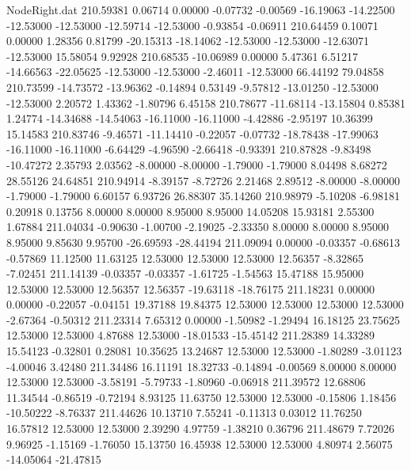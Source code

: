 \begin{filecontents}{NodeRight.dat}
 210.59381    0.06714    0.00000    -0.07732   -0.00569  -16.19063  -14.22500  -12.53000  -12.53000  -12.59714  -12.53000   -0.93854   -0.06911
 210.64459    0.10071    0.00000     1.28356    0.81799  -20.15313  -18.14062  -12.53000  -12.53000  -12.63071  -12.53000   15.58054    9.92928
 210.68535  -10.06989    0.00000     5.47361    6.51217  -14.66563  -22.05625  -12.53000  -12.53000   -2.46011  -12.53000   66.44192   79.04858
 210.73599  -14.73572  -13.96362    -0.14894    0.53149   -9.57812  -13.01250  -12.53000  -12.53000    2.20572    1.43362   -1.80796    6.45158
 210.78677  -11.68114  -13.15804     0.85381    1.24774  -14.34688  -14.54063  -16.11000  -16.11000   -4.42886   -2.95197   10.36399   15.14583
 210.83746   -9.46571  -11.14410    -0.22057   -0.07732  -18.78438  -17.99063  -16.11000  -16.11000   -6.64429   -4.96590   -2.66418   -0.93391
 210.87828   -9.83498  -10.47272     2.35793    2.03562   -8.00000   -8.00000   -1.79000   -1.79000    8.04498    8.68272   28.55126   24.64851
 210.94914   -8.39157   -8.72726     2.21468    2.89512   -8.00000   -8.00000   -1.79000   -1.79000    6.60157    6.93726   26.88307   35.14260
 210.98979   -5.10208   -6.98181     0.20918    0.13756    8.00000    8.00000    8.95000    8.95000   14.05208   15.93181    2.55300    1.67884
 211.04034   -0.90630   -1.00700    -2.19025   -2.33350    8.00000    8.00000    8.95000    8.95000    9.85630    9.95700  -26.69593  -28.44194
 211.09094    0.00000   -0.03357    -0.68613   -0.57869   11.12500   11.63125   12.53000   12.53000   12.53000   12.56357   -8.32865   -7.02451
 211.14139   -0.03357   -0.03357    -1.61725   -1.54563   15.47188   15.95000   12.53000   12.53000   12.56357   12.56357  -19.63118  -18.76175
 211.18231    0.00000    0.00000    -0.22057   -0.04151   19.37188   19.84375   12.53000   12.53000   12.53000   12.53000   -2.67364   -0.50312
 211.23314    7.65312    0.00000    -1.50982   -1.29494   16.18125   23.75625   12.53000   12.53000    4.87688   12.53000  -18.01533  -15.45142
 211.28389   14.33289   15.54123    -0.32801    0.28081   10.35625   13.24687   12.53000   12.53000   -1.80289   -3.01123   -4.00046    3.42480
 211.34486   16.11191   18.32733    -0.14894   -0.00569    8.00000    8.00000   12.53000   12.53000   -3.58191   -5.79733   -1.80960   -0.06918
 211.39572   12.68806   11.34544    -0.86519   -0.72194    8.93125   11.63750   12.53000   12.53000   -0.15806    1.18456  -10.50222   -8.76337
 211.44626   10.13710    7.55241    -0.11313    0.03012   11.76250   16.57812   12.53000   12.53000    2.39290    4.97759   -1.38210    0.36796
 211.48679    7.72026    9.96925    -1.15169   -1.76050   15.13750   16.45938   12.53000   12.53000    4.80974    2.56075  -14.05064  -21.47815

\end{filecontents}
